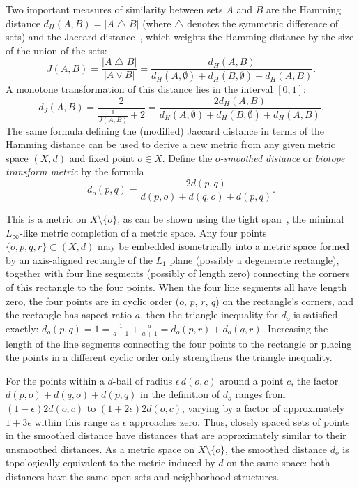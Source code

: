 \documentclass[10pt, conference, compsocconf]{IEEEtran}
\def\symdiff{\mathbin{\triangle}}
\begin{document}
Two important measures of similarity between sets $A$ and $B$ are the Hamming distance $d_H(A,B)=|A\symdiff B|$ (where $\symdiff$ denotes the symmetric difference of sets) and the Jaccard distance~\cite{Jac-BSV-01}, which weights the Hamming distance by the size of the union of the sets:
$$J(A,B)=\frac{|A\symdiff B|}{|A\vee B|}=\frac{d_H(A,B)}{d_H(A,\emptyset)+d_H(B,\emptyset)-d_H(A,B)}.$$
A monotone transformation of this distance lies in the interval $[0,1]$:
$$d_J(A,B)=\frac{2}{\frac{1}{J(A,B)}+2}
=\frac{2d_H(A,B)}{d_H(A,\emptyset)+d_H(B,\emptyset)+d_H(A,B)}.$$
The same formula defining the (modified) Jaccard distance in terms of the Hamming distance can be used to derive a new metric from any given metric space $(X,d)$ and fixed point $o\in X$. Define the \emph{$o$-smoothed distance} or \emph{biotope transform metric} by the formula
$$d_o(p,q)=\frac{2d(p,q)}{d(p,o)+d(q,o)+d(p,q)}.$$

This is a metric on $X\setminus\{o\}$, as can be shown using the tight span~\cite{Isb-CMH-64,Dre-AiM-84}, the minimal $L_\infty$-like metric completion of a metric space.
Any four points $\{o,p,q,r\}\subset (X,d)$ may be embedded isometrically into a metric space formed by an axis-aligned rectangle of the $L_1$ plane (possibly a degenerate rectangle), together with four line segments (possibly of length zero) connecting the corners of this rectangle to the four points. When the four line segments all have length zero, the four points are in cyclic order ($o$, $p$, $r$, $q$) on the rectangle's corners, and the rectangle has aspect ratio $a$, then the triangle inequality for $d_o$ is satisfied exactly: $d_o(p,q)=1=\frac{1}{a+1}+\frac{a}{a+1}=d_o(p,r)+d_o(q,r)$. Increasing the length of the line segments connecting the four points to the rectangle or placing the points in a different cyclic order only strengthens the triangle inequality.

For the points within a $d$-ball of radius $\epsilon\,d(o,c)$ around a point $c$, the factor $d(p,o)+d(q,o)+d(p,q)$ in the definition of $d_o$ ranges from $(1-\epsilon)2d(o,c)$ to $(1+2\epsilon)2d(o,c)$, varying by a factor of approximately $1+3\epsilon$ within this range as $\epsilon$ approaches zero. Thus, closely spaced sets of points in the smoothed distance have distances that are approximately similar to their unsmoothed distances. As a metric space on $X\setminus\{o\}$, the smoothed distance $d_o$ is  topologically equivalent to the metric induced by $d$ on the same space: both distances have the same open sets and neighborhood structures.
\end{document}
